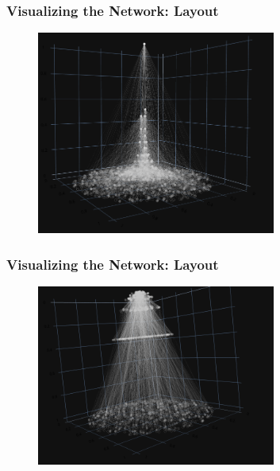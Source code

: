 \documentclass[fleqn]{beamer}
\begin{document}
    \begin{frame}
        \frametitle{Visualizing the Network: Layout}
        \begin{figure}[htpb]
            \centering
            \includegraphics[width=0.7\textwidth]{./pics/plot_lin.png}
        \end{figure}
    \end{frame}

    \begin{frame}
        \frametitle{Visualizing the Network: Layout}
        \begin{figure}[htpb]
            \centering
            \includegraphics[width=0.7\textwidth]{./pics/plot_exp.png}
        \end{figure}
    \end{frame}
\end{document}
